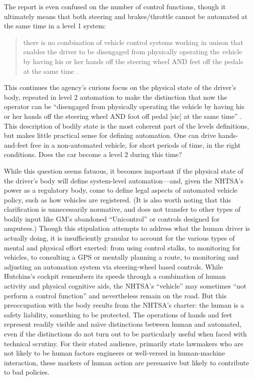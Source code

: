 The report is even confused on the number of control functions, though
it ultimately means that both steering and brakes/throttle cannot be
automated at the same time in a level 1 system: 
\begin{quote}
there is no combination of vehicle control systems working in unison
that enables the driver to be disengaged from physically operating the
vehicle by having his or her hands off the steering wheel AND feet off
the pedals at the same time \cite[p. 4]{NHTSA}.
\end{quote}
This continues the agency's curious focus on the physical state of the
driver's body, repeated in level 2 automation to make the distinction
that now the operator can be ``disengaged from physically operating the
vehicle by having his or her hands off the steering wheel AND foot off
pedal [sic] at the same time'' \cite[p. 5]{NHTSA}. This description of bodily state is
the most coherent part of the levels definitions, but makes little
practical sense for defining automation. One can drive hands-and-feet
free in a non-automated vehicle, for short periods of time, in the
right conditions. Does the car become a level 2 during this time?


While this question seems fatuous, it becomes important if the
physical state of the driver's body will define system-level
automation---and, given the NHTSA's power as a regulatory body, come
to define legal aspects of automated vehicle policy, such as how
vehicles are registered. (It is also worth
noting that this clarification is
unnecessarily normative, and does not transfer to other types of
bodily input like GM's abandoned ``Unicontrol'' or controls designed
for amputees.) Though this stipulation attempts to address what the
human driver is actually doing, it is insufficiently granular to
account for the various types of mental and physical effort exerted:
from using control stalks, to monitoring for vehicles, to consulting a
GPS or mentally planning a route, to monitoring and adjusting an
automation system via steering-wheel based controls. While Hutchins's
cockpit remembers its speeds through a combination of 
human activity and physical cognitive aids, the NHTSA's ``vehicle''
may sometimes ``not perform a control function'' \cite[p. 3]{NHTSA} and
nevertheless remain on the road. But this
preoccupation with the body results from the NHTSA's charter: the
human is a safety liability, something to be protected. The operations
of hands and feet represent readily visible and na\"{\i}ve distinctions
between human and automated, even if the distinctions do not turn out
to be particularly useful when faced with technical scrutiny.
For their stated audience, primarily state lawmakers who are not
likely to be human factors engineers or well-versed in human-machine
interaction, these markers of human action are persuasive but likely
to contribute to bad policies.

